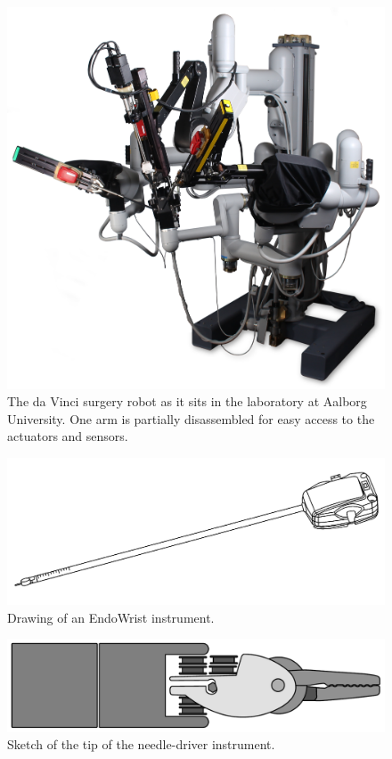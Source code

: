 \documentclass[a4paper, 10 pt, conference]{ieeeconf}      %
\begin{document}
\begin{figure}[t]
    \centering
       \includegraphics[width=0.7\linewidth]{graphics/patient_cart.png}
    \caption{The da Vinci surgery robot as it sits in the laboratory at Aalborg University. One arm is partially disassembled for easy access to the actuators and sensors. \label{fig:patient_cart}}
\end{figure}


\begin{figure}[t]
    \centering
       \includegraphics[width=0.8\linewidth]{graphics/US08834489-20140916-D00004-instrument-cutout}
    \caption{Drawing of an EndoWrist instrument. \label{fig:instrument}}
\end{figure}

\begin{figure}[t]
    \centering
       \includegraphics[width=0.8\linewidth]{graphics/Needle-driver_conceptual.pdf}
    \caption{Sketch of the tip of the needle-driver instrument. \label{fig:gripper_tip}}
\end{figure}
\end{document}
